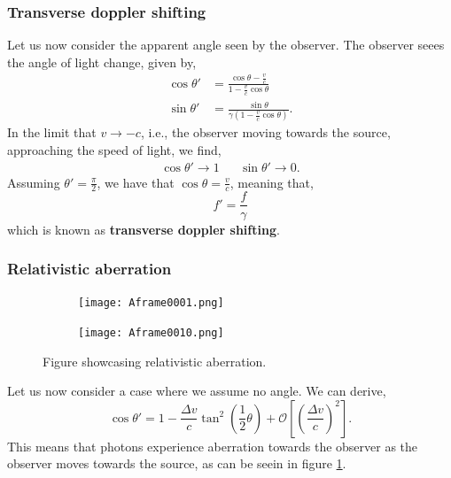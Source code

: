 \documentclass{book}
\begin{document}
\subsubsection{Transverse doppler shifting}
Let us now consider the apparent angle seen by the observer. The observer seees the angle of light change, given by,
\begin{align}
	\cos\theta' & = \frac{\cos\theta - \frac{v}{c}}{1 - \frac{v}{c}\cos\theta} \\
	\sin\theta' & = \frac{\sin\theta}{\gamma\left(1 - \frac{v}{c}\cos\theta\right)}.
\end{align}
In the limit that $v\to -c$, i.e., the observer moving towards the source, approaching the speed of light, we find,
\begin{align}
	\cos\theta' \to 1 && \sin\theta' \to 0.
\end{align}
Assuming $\theta' = \frac{\pi}{2}$, we have that $\cos\theta = \frac{v}{c}$, meaning that,
\begin{equation}
	f' = \frac{f}{\gamma}
\end{equation}
which is known as \textbf{transverse doppler shifting}.
\subsubsection{Relativistic aberration}
\begin{figure}
	\centering
	\begin{subfigure}{0.5\textwidth}
		\texttt{[image: Aframe0001.png]}
	\end{subfigure}
	\begin{subfigure}{0.5\textwidth}
		\texttt{[image: Aframe0010.png]}
	\end{subfigure}
	\caption{Figure showcasing relativistic aberration.}
	\label{aberration}
\end{figure}
Let us now consider a case where we assume no angle. We can derive,
\begin{equation}
	\cos\theta' = 1 - \frac{\Delta v}{c}\tan^2\left(\frac{1}{2}\theta\right) + \mathcal{O}\left[\left(\frac{\Delta v}{c}\right)^2\right].
\end{equation}
This means that photons experience aberration towards the observer as the observer moves towards the source, as can be seein in figure \ref{aberration}.
\end{document}
